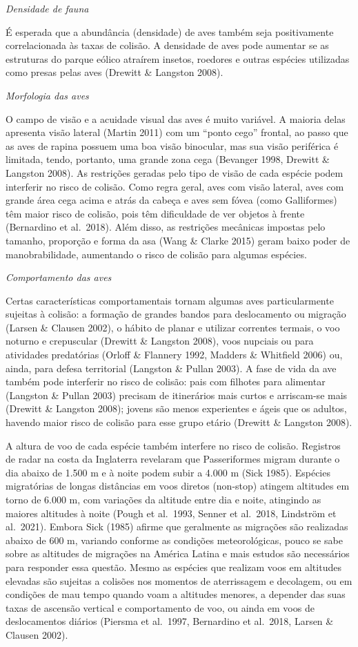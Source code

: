 \documentclass[
  oneside]{scrbook}
\begin{document}
\emph{Densidade de fauna}

É esperada que a abundância (densidade) de aves também seja positivamente correlacionada às taxas de colisão. A densidade de aves pode aumentar se as estruturas do parque eólico atraírem insetos, roedores e outras espécies utilizadas como presas pelas aves (Drewitt \& Langston 2008).

\emph{Morfologia das aves}

O campo de visão e a acuidade visual das aves é muito variável. A maioria delas apresenta visão lateral (Martin 2011) com um ``ponto cego'' frontal, ao passo que as aves de rapina possuem uma boa visão binocular, mas sua visão periférica é limitada, tendo, portanto, uma grande zona cega (Bevanger 1998, Drewitt \& Langston 2008). As restrições geradas pelo tipo de visão de cada espécie podem interferir no risco de colisão. Como regra geral, aves com visão lateral, aves com grande área cega acima e atrás da cabeça e aves sem fóvea (como Galliformes) têm maior risco de colisão, pois têm dificuldade de ver objetos à frente (Bernardino et al.~2018). Além disso, as restrições mecânicas impostas pelo tamanho, proporção e forma da asa (Wang \& Clarke 2015) geram baixo poder de manobrabilidade, aumentando o risco de colisão para algumas espécies.

\emph{Comportamento das aves}

Certas características comportamentais tornam algumas aves particularmente sujeitas à colisão: a formação de grandes bandos para deslocamento ou migração (Larsen \& Clausen 2002), o hábito de planar e utilizar correntes termais, o voo noturno e crepuscular (Drewitt \& Langston 2008), voos nupciais ou para atividades predatórias (Orloff \& Flannery 1992, Madders \& Whitfield 2006) ou, ainda, para defesa territorial (Langston \& Pullan 2003). A fase de vida da ave também pode interferir no risco de colisão: pais com filhotes para alimentar (Langston \& Pullan 2003) precisam de itinerários mais curtos e arriscam-se mais (Drewitt \& Langston 2008); jovens são menos experientes e ágeis que os adultos, havendo maior risco de colisão para esse grupo etário (Drewitt \& Langston 2008).

A altura de voo de cada espécie também interfere no risco de colisão. Registros de radar na costa da Inglaterra revelaram que Passeriformes migram durante o dia abaixo de 1.500 m e à noite podem subir a 4.000 m (Sick 1985). Espécies migratórias de longas distâncias em voos diretos (non-stop) atingem altitudes em torno de 6.000 m, com variações da altitude entre dia e noite, atingindo as maiores altitudes à noite (Pough et al.~1993, Senner et al.~2018, Lindström et al.~2021). Embora Sick (1985) afirme que geralmente as migrações são realizadas abaixo de 600 m, variando conforme as condições meteorológicas, pouco se sabe sobre as altitudes de migrações na América Latina e mais estudos são necessários para responder essa questão. Mesmo as espécies que realizam voos em altitudes elevadas são sujeitas a colisões nos momentos de aterrissagem e decolagem, ou em condições de mau tempo quando voam a altitudes menores, a depender das suas taxas de ascensão vertical e comportamento de voo, ou ainda em voos de deslocamentos diários (Piersma et al.~1997, Bernardino et al.~2018, Larsen \& Clausen 2002).
\end{document}
